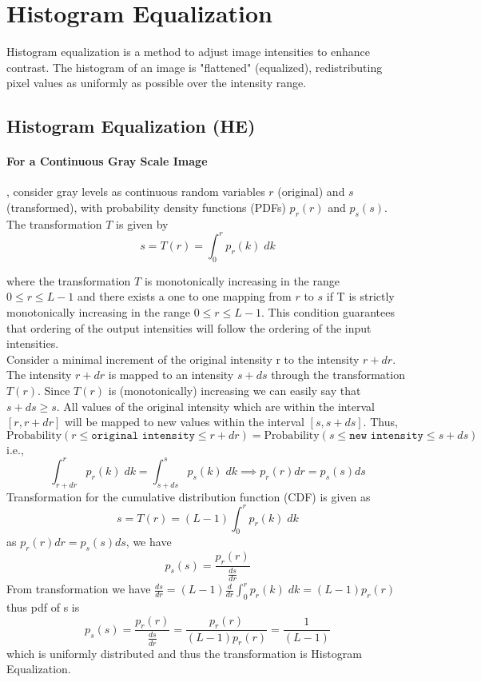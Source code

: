 \section{Histogram Equalization}

Histogram equalization is a method to adjust image intensities to enhance contrast. The histogram of an image is "flattened" (equalized), redistributing pixel values as uniformly as possible over the intensity range.\cite{stathaki2014histeq}
\subsection{Histogram Equalization (HE)}

\paragraph{For a Continuous Gray Scale Image}, consider gray levels as continuous random variables $ r $ (original) and $ s $ (transformed), with probability density functions (PDFs) $p_r(r)$ and $ p_s(s) $. The transformation $T$ is given by
$$
s = T(r) = \int_0^r p_r(k)\;dk
$$

where the transformation $T$ is monotonically increasing in the range $ 0 \le r \le L-1$ and there exists a one to one mapping from $r$ to $s$ if T is strictly monotonically increasing in the range $ 0 \le r \le L-1$. This condition guarantees that ordering of the output intensities will follow the ordering of the input intensities.\\

Consider a minimal increment of the original intensity r to the intensity $r +
dr$. The intensity $r + dr$ is mapped to an intensity $s + ds$ through the
transformation $T(r)$. Since $T(r)$ is (monotonically) increasing we can easily say that $s + ds \ge s$. All values of the original intensity which are within the interval $[r, r + dr]$ will be mapped to new values within the interval $[s, s + ds]$. Thus, $$\text{Probability}(r \le \texttt{original intensity} \le r + dr)=\text{Probability}(s \le \texttt{new intensity} \le s + ds)$$ i.e.,
$$
    \int_{r + dr}^r p_r(k)\;dk = \int_{s + ds}^s p_s(k)\;dk \implies p_r(r)dr = p_s(s)ds
$$
Transformation for the cumulative distribution function (CDF) is given as 
$$
s = T(r) = (L-1) \int_0^r p_r(k)\;dk
$$
as $p_r(r)dr = p_s(s)ds$, we have $$p_s(s) = \frac{p_r(r)}{\frac{ds}{dr}}$$
From transformation we have $\frac{ds}{dr} = (L-1)  \frac{d}{dr} \int_0^r p_r(k)\;dk = (L-1) p_r(r)$ thus pdf of s is 
$$p_s(s) = \frac{p_r(r)}{\frac{ds}{dr}} = \frac{p_r(r)}{(L-1) p_r(r)} = \frac{1}{(L-1)} $$ which is uniformly distributed and thus the transformation is Histogram Equalization.
